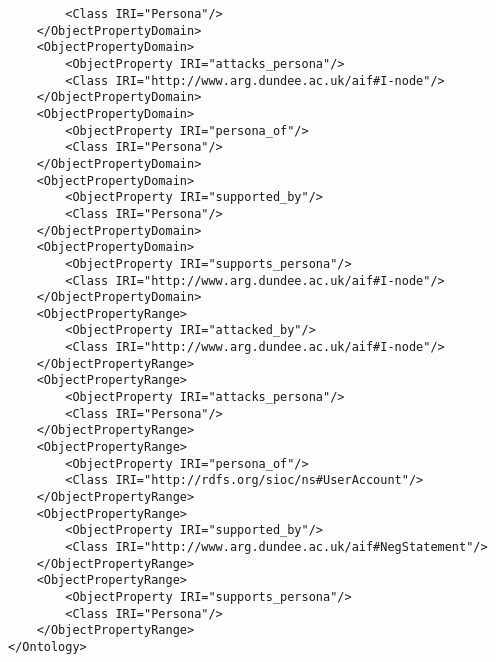 \begin{verbatim}
        <Class IRI="Persona"/>
    </ObjectPropertyDomain>
    <ObjectPropertyDomain>
        <ObjectProperty IRI="attacks_persona"/>
        <Class IRI="http://www.arg.dundee.ac.uk/aif#I-node"/>
    </ObjectPropertyDomain>
    <ObjectPropertyDomain>
        <ObjectProperty IRI="persona_of"/>
        <Class IRI="Persona"/>
    </ObjectPropertyDomain>
    <ObjectPropertyDomain>
        <ObjectProperty IRI="supported_by"/>
        <Class IRI="Persona"/>
    </ObjectPropertyDomain>
    <ObjectPropertyDomain>
        <ObjectProperty IRI="supports_persona"/>
        <Class IRI="http://www.arg.dundee.ac.uk/aif#I-node"/>
    </ObjectPropertyDomain>
    <ObjectPropertyRange>
        <ObjectProperty IRI="attacked_by"/>
        <Class IRI="http://www.arg.dundee.ac.uk/aif#I-node"/>
    </ObjectPropertyRange>
    <ObjectPropertyRange>
        <ObjectProperty IRI="attacks_persona"/>
        <Class IRI="Persona"/>
    </ObjectPropertyRange>
    <ObjectPropertyRange>
        <ObjectProperty IRI="persona_of"/>
        <Class IRI="http://rdfs.org/sioc/ns#UserAccount"/>
    </ObjectPropertyRange>
    <ObjectPropertyRange>
        <ObjectProperty IRI="supported_by"/>
        <Class IRI="http://www.arg.dundee.ac.uk/aif#NegStatement"/>
    </ObjectPropertyRange>
    <ObjectPropertyRange>
        <ObjectProperty IRI="supports_persona"/>
        <Class IRI="Persona"/>
    </ObjectPropertyRange>
</Ontology>
\end{verbatim}